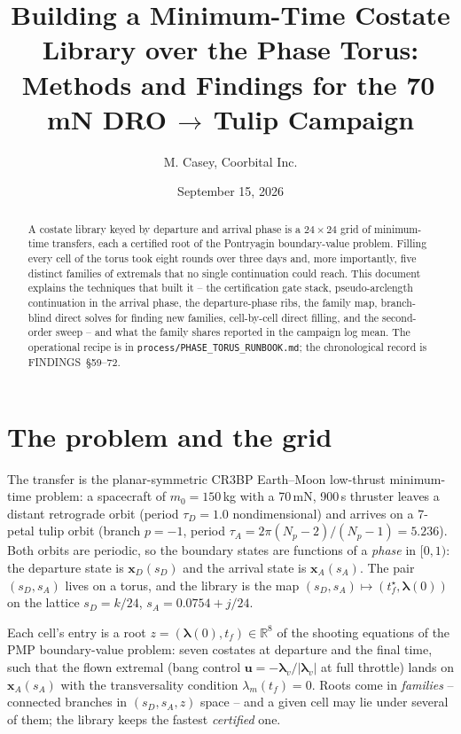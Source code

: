 \documentclass[11pt]{article}
\title{Building a Minimum-Time Costate Library over the Phase Torus:\\
Methods and Findings for the 70\,mN DRO\,$\to$\,Tulip Campaign}
\author{M. Casey, Coorbital Inc.}
\date{September 15, 2026}
\newcommand{\sD}{s_D}
\newcommand{\sA}{s_A}
\newcommand{\tf}{t_f}
\newcommand{\code}[1]{\texttt{#1}}
\begin{document}
\maketitle

\begin{abstract}
A costate library keyed by departure and arrival phase is a $24\times24$
grid of minimum-time transfers, each a certified root of the Pontryagin
boundary-value problem. Filling every cell of the torus took eight rounds
over three days and, more importantly, five distinct families of
extremals that no single continuation could reach. This document explains
the techniques that built it -- the certification gate stack,
pseudo-arclength continuation in the arrival phase, the departure-phase
ribs, the family map, branch-blind direct solves for finding new families,
cell-by-cell direct filling, and the second-order sweep -- and what the
family shares reported in the campaign log mean. The operational recipe
is in \code{process/PHASE\_TORUS\_RUNBOOK.md}; the chronological record is
FINDINGS~\S59--72.
\end{abstract}

\section{The problem and the grid}

The transfer is the planar-symmetric CR3BP Earth--Moon low-thrust
minimum-time problem: a spacecraft of $m_0 = 150$\,kg with a 70\,mN, 900\,s
thruster leaves a distant retrograde orbit (period $\tau_D = 1.0$
nondimensional) and arrives on a 7-petal tulip orbit (branch $p = -1$,
period $\tau_A = 2\pi(N_p-2)/(N_p-1) = 5.236$). Both orbits are periodic,
so the boundary states are functions of a \emph{phase} in $[0,1)$: the
departure state is $\bm{x}_D(\sD)$ and the arrival state is
$\bm{x}_A(\sA)$. The pair $(\sD,\sA)$ lives on a torus, and the library is
the map $(\sD,\sA)\mapsto (\tf^\star,\bm{\lambda}(0))$ on the lattice
$\sD = k/24$, $\sA = 0.0754 + j/24$.

Each cell's entry is a root $z = (\bm{\lambda}(0), \tf)\in\mathbb{R}^8$
of the shooting equations of the PMP boundary-value problem: seven
costates at departure and the final time, such that the flown extremal
(bang control $\bm{u} = -\bm{\lambda}_v/|\bm{\lambda}_v|$ at full
throttle) lands on $\bm{x}_A(\sA)$ with the transversality condition
$\lambda_m(\tf) = 0$. Roots come in \emph{families} -- connected branches
in $(\sD,\sA,z)$ space -- and a given cell may lie under several of them;
the library keeps the fastest \emph{certified} one.
\end{document}
